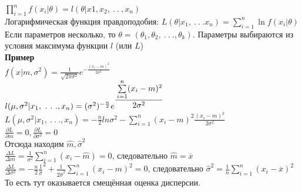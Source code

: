 \documentclass[russian, 12pt, fleqn]{article}
\begin{document}
$\displaystyle{\prod_{i = 1} ^ n} f(x_i|\theta) = l(\theta|x1,x_2,\ .\ .\ ,x_n)$\\
Логарифмическая функция правдоподобия: $L(\theta|x_1,\ .\ .\ . x_n) = \displaystyle{\sum \limits_{i = 1} ^ {n}} \ln f(x_i|\theta)$\\
Если параметров несколько, то $\theta = (\theta_1, \theta_2, \ .\ .\ . ,\theta_k)$. Параметры выбираются из условия максимума функции $l$ (или $L$)\\
\textbf{Пример}\\ 
$f(x|m, \sigma^2) = \frac{1}{\sqrt{2\pi\sigma^2}} e^{-\frac{(x_i - m)^2}{2\sigma^2}}$\\
$l(\mu, \sigma^2|x_1, \ .\ .\ ., x_n) = (\sigma^2)^{-\frac{n}{2}}e^{\displaystyle{\cfrac{\sum \limits_{i = 1}^{n}(x_i - m)^2}{2\sigma^2}} }$\\
$L(\mu, \sigma^2|x_1, \ .\ .\ ., x_n) = - \frac{n}{2} ln \sigma^2 - \displaystyle{\sum \limits_{i = 1}^{n}}(x_i - m)^2\frac{(x_i - m)^2}{2\sigma^2}$\\
$\frac{\partial L}{\partial m} = 0, \frac{\partial L}{\partial \sigma^2} = 0$\\
Отсюда находим $\hat{m}, \hat{\sigma}^2$\\
$\frac{\Delta L}{\Delta m} = \frac{1}{\sigma^2} \displaystyle{\sum \limits _{i = 1} ^ {n} } (x_i - \hat{m}) = 0$, следовательно $\hat{m} = \overline{x}$\\
$\frac{\Delta L}{\Delta \sigma^2} = -\frac{n}{2} \frac{1}{\hat{\sigma}}^2 + \frac{1}{2\hat{\sigma}^2}  \displaystyle{\sum \limits _{i = 1} ^ {n} } (x_i - m)^2 = 0$, следовательно 
$\hat{\sigma}^2 = \frac{1}{n}  \displaystyle{\sum \limits _{i = 1} ^ {n} } (x_i - \overline{x})^2$\\
То есть тут оказывается смещённая оценка дисперсии.
\end{document}
